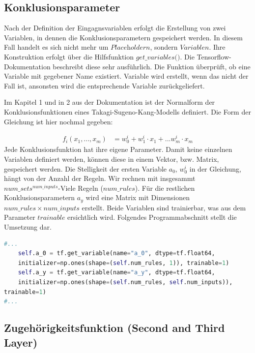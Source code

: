 \subsection{Konklusionsparameter}\label{konklusionsparameter}

Nach der Definition der Eingagnsvariablen erfolgt die Erstellung von zwei Variablen, in dennen die Konklusionsparametern gespeichert werden. In diesem Fall handelt es sich nicht mehr um $\textit{Placeholdern}$, sondern $\textit{Variablen}$. Ihre Konstruktion erfolgt über die Hilfsfunktion $\textit{get\_variables()}$. Die Tensorflow-Dokumentation beschreibt diese sehr ausführlich. Die Funktion überprüft, ob eine Variable mit gegebener Name existiert. Variable wird erstellt, wenn das nicht der Fall ist, ansonsten wird die entsprechende Variable zurückgeliefert.

Im Kapitel 1 und in 2 aus der Dokumentation ist der Normalform der Konklusionsfunktionen eines Takagi-Sugeno-Kang-Modells definiert. Die Form der Gleichung ist hier nochmal gegeben:

\begin{align}
f_i(x_1, ..., x_m) & = w_0^i + w_1^i\cdot x_1 + ... w_m^i\cdot x_m
\end{align}
Jede Konklusionsfunktion hat ihre eigene Parameter. Damit keine einzelnen Variablen definiert werden, können diese in einem Vektor, bzw. Matrix, gespeichert werden. Die Stelligkeit der ersten Variable $a_0$, $w_0^i$ in der Gleichung, hängt von der Anzahl der Regeln. Wir rechnen mit insgesammt $num\_sets^{num\_inputs}$-Viele Regeln ($\textit{num\_rules}$). Für die restlichen Konklusionsparametern $a_y$ wird eine Matrix mit Dimensionen $num\_rules\times num\_inputs$ erstellt. Beide Variablen sind trainierbar, was aus dem Parameter $\textit{trainable}$ ersichtlich wird. Folgendes Programmabschnitt stellt die Umsetzung dar.

\begin{lstlisting}[language=Python]
#...
	self.a_0 = tf.get_variable(name="a_0", dtype=tf.float64,
	initializer=np.ones(shape=(self.num_rules, 1)), trainable=1)
	self.a_y = tf.get_variable(name="a_y", dtype=tf.float64, 
	initializer=np.ones(shape=(self.num_rules, self.num_inputs)), 
trainable=1)
#...
\end{lstlisting}

\subsection{Zugehörigkeitsfunktion (Second and Third Layer)}\label{zugehuxf6rigkeitsfunktion-second-and-third-layer}

